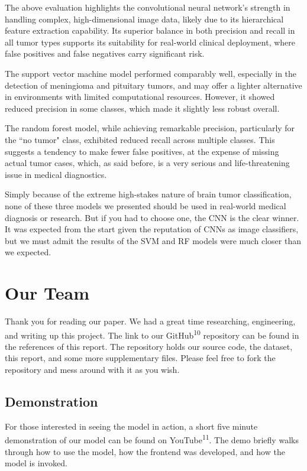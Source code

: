 \documentclass[conference]{IEEEtran}
\begin{document}
The above evaluation highlights the convolutional neural network's strength in handling complex, high-dimensional image data, likely due to its hierarchical feature extraction capability. Its superior balance in both precision and recall in all tumor types supports its suitability for real-world clinical deployment, where false positives and false negatives carry significant risk.

The support vector machine model performed comparably well, especially in the detection of meningioma and pituitary tumors, and may offer a lighter alternative in environments with limited computational resources. However, it showed reduced precision in some classes, which made it slightly less robust overall.

The random forest model, while achieving remarkable precision, particularly for the ``no tumor" class, exhibited reduced recall across multiple classes. This suggests a tendency to make fewer false positives, at the expense of missing actual tumor cases, which, as said before, is a very serious and life-threatening issue in medical diagnostics.

Simply because of the extreme high-stakes nature of brain tumor classification, none of these three models we presented should be used in real-world medical diagnosis or research. But if you had to choose one, the CNN is the clear winner. It was expected from the start given the reputation of CNNs as image classifiers, but we must admit the results of the SVM and RF models were much closer than we expected.

\section{\large Our Team}

Thank you for reading our paper. We had a great time researching, engineering, and writing up this project. The link to our GitHub\textsuperscript{10} repository can be found in the references of this report. The repository holds our source code, the dataset, this report, and some more supplementary files. Please feel free to fork the repository and mess around with it as you wish.

\subsection{\large Demonstration}

For those interested in seeing the model in action, a short five minute demonstration of our model can be found on YouTube\textsuperscript{11}. The demo briefly walks through how to use the model, how the frontend was developed, and how the model is invoked.
\end{document}
